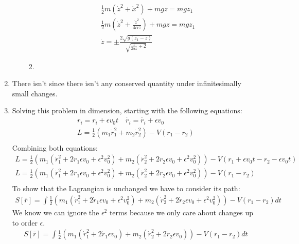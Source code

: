 \documentclass[12pt]{article}
\begin{document}
\begin{enumerate}
\begin{enumerate}
\begin{enumerate}
\begin{gather}
                    \frac{1}{2}m(\dot{z}^2+\dot{x}^2)+mgz=mgz_1\\
                    \frac{1}{2}m(\dot{z}^2+\frac{\dot{z}^2}{4\alpha z})+mgz=mgz_1\\
                    \dot{z}=\pm\frac{2 \sqrt{g \left(z_1-z\right)}}{\sqrt{\frac{1}{2 \alpha  z}+2}}
                \end{gather}
                \item
            \end{enumerate}
        \end{enumerate}
        \item There isn't since there isn't any conserved quantity under infinitesimally small changes.
        \item Solving this problem in dimension, starting with the following equations:
        \begin{gather}
            r_i=r_i+\epsilon v_0 t\quad\dot{r_i}=\dot{r_i}+\epsilon v_0\\
            L=\frac{1}{2}\left(m_1 \dot{r}_1^2+m_2 \dot{r}_2^2\right)-V(r_1-r_2)\\
        \end{gather}
        Combining both equations:
        \begin{gather}
            L=\frac{1}{2}\left(m_1 \left(\dot{r}_1^2+2\dot{r}_1\epsilon v_0 +\epsilon^2 v_0^2\right)+m_2 \left(\dot{r}_2^2+2\dot{r}_2\epsilon v_0+ \epsilon^2 v_0^2\right)\right)-V(r_1+\epsilon v_0 t-r_2-\epsilon v_0 t)\\
            L=\frac{1}{2}\left(m_1 \left(\dot{r}_1^2+2\dot{r}_1\epsilon v_0 +\epsilon^2 v_0^2\right)+m_2 \left(\dot{r}_2^2+2\dot{r}_2\epsilon v_0+ \epsilon^2 v_0^2\right)\right)-V(r_1-r_2)\\
        \end{gather}
        To show that the Lagrangian is unchanged we have to consider its path:
        \begin{gather}
            S[\bar{r}]=\int \frac{1}{2}\left(m_1 \left(\dot{r}_1^2+2\dot{r}_1\epsilon v_0 +\epsilon^2 v_0^2\right)+m_2 \left(\dot{r}_2^2+2\dot{r}_2\epsilon v_0+ \epsilon^2 v_0^2\right)\right)-V(r_1-r_2)dt
        \end{gather}
        We know we can ignore the $\epsilon^2$ terms because we only care about changes up to order $\epsilon$.
        \begin{gather}
            S[\bar{r}]=\int \frac{1}{2}\left(m_1 \left(\dot{r}_1^2+2\dot{r}_1\epsilon v_0\right)+m_2 \left(\dot{r}_2^2+2\dot{r}_2\epsilon v_0\right)\right)-V(r_1-r_2)dt

\end{gather}
\end{enumerate}
\end{document}
